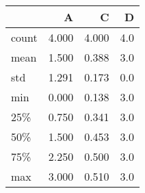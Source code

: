 \begin{tabular}{lrrr}
\toprule
{} &      A &      C &    D \\
\midrule
count &  4.000 &  4.000 &  4.0 \\
mean  &  1.500 &  0.388 &  3.0 \\
std   &  1.291 &  0.173 &  0.0 \\
min   &  0.000 &  0.138 &  3.0 \\
25\%   &  0.750 &  0.341 &  3.0 \\
50\%   &  1.500 &  0.453 &  3.0 \\
75\%   &  2.250 &  0.500 &  3.0 \\
max   &  3.000 &  0.510 &  3.0 \\
\bottomrule
\end{tabular}

